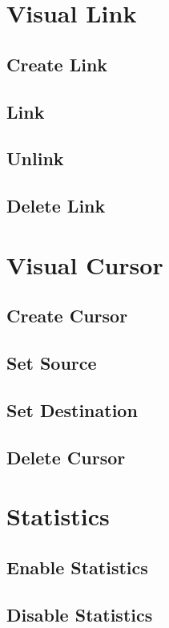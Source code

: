 \section{Visual Link}

\subsection{Create Link}
\subsection{Link}
\subsection{Unlink}
\subsection{Delete Link}

\section{Visual Cursor}

\subsection{Create Cursor}
\subsection{Set Source}
\subsection{Set Destination}
\subsection{Delete Cursor}

\section{Statistics}

\subsection{Enable Statistics}
\subsection{Disable Statistics}
